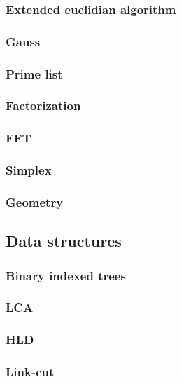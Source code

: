 \documentclass[a4paper, twocolumn, 10pt]{report}
\begin{document}
\subsubsection*{Extended euclidian algorithm}

\subsubsection*{Gauss}

\subsubsection*{Prime list}

\subsubsection*{Factorization}

\subsubsection*{FFT}

\subsubsection*{Simplex}

\subsubsection*{Geometry}


\newpage
\subsection*{Data structures}
\subsubsection*{Binary indexed trees}

\subsubsection*{LCA}

\subsubsection*{HLD}

\subsubsection*{Link-cut}

\end{document}
